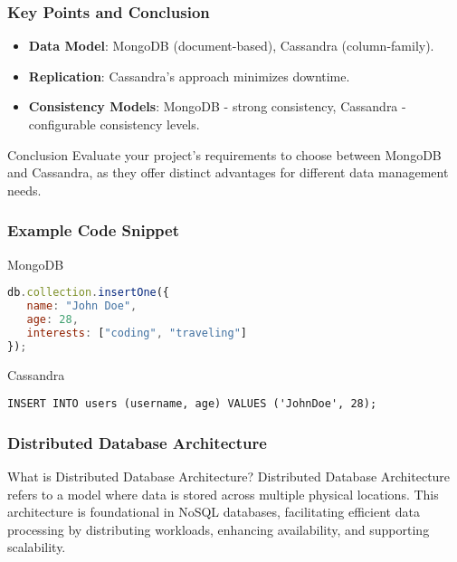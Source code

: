 \documentclass[aspectratio=169]{beamer}
\begin{document}
\begin{frame}[fragile]
    \frametitle{Key Points and Conclusion}
    \begin{itemize}
        \item \textbf{Data Model}: MongoDB (document-based), Cassandra (column-family).
        \item \textbf{Replication}: Cassandra’s approach minimizes downtime.
        \item \textbf{Consistency Models}: MongoDB - strong consistency, Cassandra - configurable consistency levels.
    \end{itemize}
    
    \begin{block}{Conclusion}
        Evaluate your project's requirements to choose between MongoDB and Cassandra, as they offer distinct advantages for different data management needs.
    \end{block}
\end{frame}

\begin{frame}[fragile]
    \frametitle{Example Code Snippet}
    \begin{block}{MongoDB}
        \begin{lstlisting}[language=JavaScript]
db.collection.insertOne({
   name: "John Doe", 
   age: 28, 
   interests: ["coding", "traveling"]
});
        \end{lstlisting}
    \end{block}

    \begin{block}{Cassandra}
        \begin{lstlisting}[language=CQL]
INSERT INTO users (username, age) VALUES ('JohnDoe', 28);
        \end{lstlisting}
    \end{block}
\end{frame}

\begin{frame}[fragile]
    \frametitle{Distributed Database Architecture}
    \begin{block}{What is Distributed Database Architecture?}
        Distributed Database Architecture refers to a model where data is stored across multiple physical locations. 
        This architecture is foundational in NoSQL databases, facilitating efficient data processing by distributing workloads, enhancing availability, and supporting scalability.
    \end{block}
\end{frame}
\end{document}
